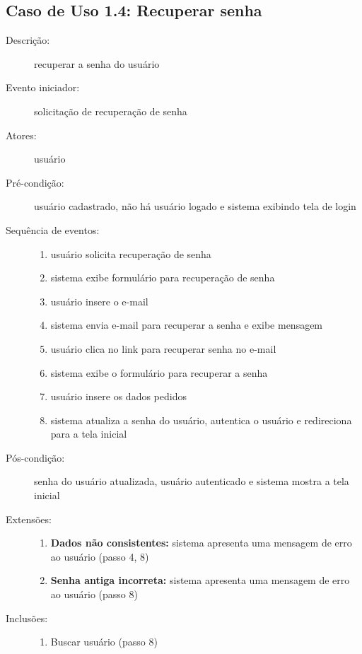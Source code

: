 \subsection{Caso de Uso 1.4: Recuperar senha}
\begin{description}
	\item[Descrição:] recuperar a senha do usuário
	\item[Evento iniciador:] solicitação de recuperação de senha
	\item[Atores:] usuário
	\item[Pré-condição:] usuário cadastrado, não há usuário logado e sistema exibindo tela de login
	\item[Sequência de eventos:] \hfill
		\begin{enumerate}
			\item{usuário solicita recuperação de senha}
			\item{sistema exibe formulário para recuperação de senha}
			\item{usuário insere o e-mail}
			\item{sistema envia e-mail para recuperar a senha e exibe mensagem}
			\item{usuário clica no link para recuperar senha no e-mail}
			\item{sistema exibe o formulário para recuperar a senha}
			\item{usuário insere os dados pedidos}
			\item{sistema atualiza a senha do usuário, autentica o usuário e redireciona para a tela inicial}
		\end{enumerate}
	\item[Pós-condição:] senha do usuário atualizada, usuário autenticado e sistema mostra a tela inicial
	\item[Extensões:] \hfill
		\begin{enumerate}
			\item{\textbf{Dados não consistentes:} sistema apresenta uma mensagem de erro ao usuário (passo 4, 8)}
			\item{\textbf{Senha antiga incorreta:} sistema apresenta uma mensagem de erro ao usuário (passo 8)}
		\end{enumerate}
	\item[Inclusões:] \hfill
		\begin{enumerate}
			\item{Buscar usuário (passo 8)}
		\end{enumerate}
\end{description}
